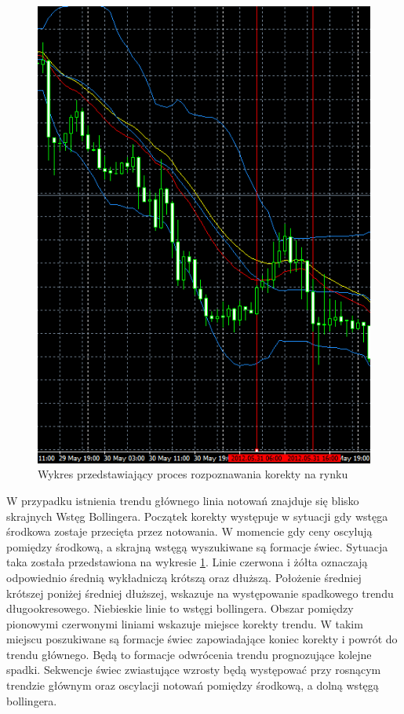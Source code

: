 \documentclass[pdflatex,11pt]{aghdpl}
\begin{document}
\begin{figure}[h!]
\begin{center}
\includegraphics[width=12cm]{trend.png}
\caption{Wykres przedstawiający proces rozpoznawania korekty na rynku}
\label{trend}
\end{center}
\end{figure} 

W przypadku istnienia trendu głównego linia notowań znajduje się blisko skrajnych Wstęg Bollingera. Początek korekty występuje w sytuacji gdy wstęga środkowa zostaje przecięta przez notowania. W momencie gdy ceny oscylują pomiędzy środkową, a skrajną wstęgą wyszukiwane są formacje świec. Sytuacja taka została przedstawiona na wykresie \ref{trend}. Linie czerwona i żółta oznaczają odpowiednio średnią wykładniczą krótszą oraz dłuższą. Położenie średniej krótszej poniżej średniej dłuższej, wskazuje na występowanie spadkowego trendu długookresowego. Niebieskie linie to wstęgi bollingera. Obszar pomiędzy pionowymi czerwonymi liniami wskazuje miejsce korekty trendu. W takim miejscu poszukiwane są formacje świec zapowiadające koniec korekty i powrót do trendu głównego. Będą to formacje odwrócenia trendu prognozujące kolejne spadki. Sekwencje świec zwiastujące wzrosty będą występować przy rosnącym trendzie głównym oraz oscylacji notowań pomiędzy środkową, a dolną wstęgą bollingera.  
\end{document}
